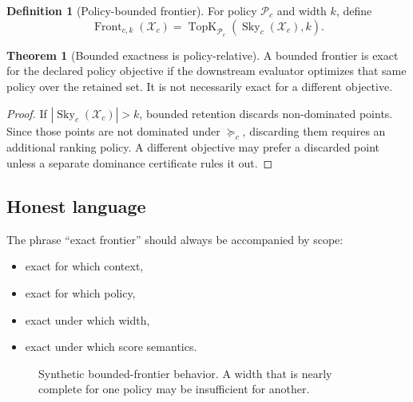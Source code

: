 \documentclass[11pt,oneside]{article}
\theoremstyle{definition}
\newtheorem{definition}{Definition}[section]
\newtheorem{theorem}{Theorem}[section]
\newcommand{\Sky}{\operatorname{Sky}}
\newcommand{\Front}{\operatorname{Front}}
\newcommand{\cand}{\mathcal{X}}
\newcommand{\Policy}{\mathcal{P}}
\begin{document}
\begin{definition}[Policy-bounded frontier]
For policy \(\Policy_c\) and width \(k\), define
\[
  \Front_{c,k}(\cand_c)
  =
  \operatorname{TopK}_{\Policy_c}\!\left(\Sky_c(\cand_c),k\right).
\]
\end{definition}

\begin{theorem}[Bounded exactness is policy-relative]
A bounded frontier is exact for the declared policy objective if the downstream evaluator optimizes that same policy over the retained set. It is not necessarily exact for a different objective.
\end{theorem}

\begin{proof}
If \(|\Sky_c(\cand_c)|>k\), bounded retention discards non-dominated points. Since those points are not dominated under \(\succeq_c\), discarding them requires an additional ranking policy. A different objective may prefer a discarded point unless a separate dominance certificate rules it out.
\end{proof}

\subsection{Honest language}
The phrase ``exact frontier'' should always be accompanied by scope:
\begin{itemize}
  \item exact for which context,
  \item exact for which policy,
  \item exact under which width,
  \item exact under which score semantics.
\end{itemize}

\begin{figure}[H]
\centering
{}
\caption{Synthetic bounded-frontier behavior. A width that is nearly complete for one policy may be insufficient for another.}
\end{figure}
\end{document}
